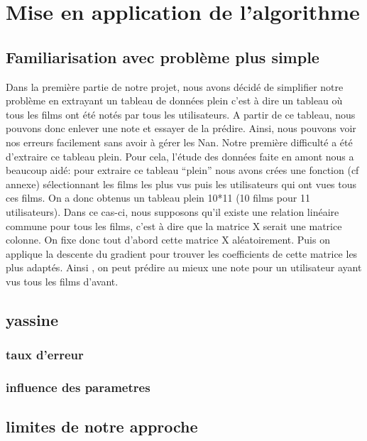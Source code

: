 \documentclass[a4paper,10pt]{article}
\begin{document}
\section{Mise en application de l'algorithme}
\subsection{Familiarisation avec problème plus simple}
Dans la première partie de notre projet, nous avons décidé de simplifier notre problème en extrayant un tableau de données 
plein c'est à dire un tableau où tous les films ont été notés par tous les utilisateurs. 
A partir de ce tableau, nous pouvons donc enlever une note et essayer de la prédire. Ainsi, nous pouvons voir nos erreurs facilement sans avoir à gérer les Nan.
Notre première difficulté a été d'extraire ce tableau plein. Pour cela, l'étude des données faite en amont nous a beaucoup aidé: pour extraire ce tableau ``plein''
nous avons crées une fonction (cf annexe) sélectionnant les films les plus vus puis les utilisateurs qui ont vues tous ces films. On a donc obtenus un
tableau plein 10*11 (10 films pour 11 utilisateurs).
Dans ce cas-ci, nous supposons qu'il existe une relation linéaire commune pour tous les films, c'est à dire que la matrice X serait une matrice colonne.
On fixe donc tout d'abord cette matrice X aléatoirement. Puis on applique la descente du gradient pour trouver les coefficients de cette matrice les plus adaptés.
Ainsi , on peut prédire au mieux une note pour un utilisateur ayant vus tous les films d'avant.
\subsection{yassine}
\subsubsection{taux d'erreur}
\subsubsection{influence des parametres}
\subsection{limites de notre approche}
\end{document}
